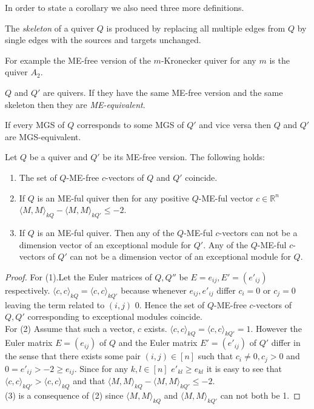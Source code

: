 \indent In order to state a corollary we also need three more definitions.
\begin{definition}
The \textit{skeleton} of a quiver $Q$ is produced by replacing all multiple edges from $Q$ by single edges with the sources and targets unchanged.\\
\end{definition}
\indent For example the ME-free version of the $m$-Kronecker quiver for any $m$ is the quiver $A_2$.
\begin{definition}
$Q$ and $Q'$ are quivers. If they have the same ME-free version and the same skeleton then they are \textit{ME-equivalent}.
\end{definition}
\begin{definition}
If every MGS of $Q$ corresponds to some MGS of $Q'$ and vice versa then $Q$ and $Q'$ are MGS-equivalent. 
\end{definition}
\begin{lemma}
\indent Let $Q$ be a quiver and $Q'$ be its ME-free version. The following holds:\label{L2}
\begin{enumerate}
\item The set of $Q$-ME-free $c$-vectors of $Q$ and $Q'$ coincide.
\item If $Q$ is an ME-ful quiver then for any positive $Q$-ME-ful vector $c\in\mathbb{R}^n$ $\langle M,M\rangle_{kQ} - \langle M,M\rangle_{kQ'} \leq -2$.
\item If $Q$ is an ME-ful quiver. Then any of the $Q$-ME-ful $c$-vectors can not be a dimension vector of an exceptional module for $Q'$. Any of the $Q$-ME-ful $c$-vectors of $Q'$ can not be a dimension vector of an exceptional module for $Q$.
\end{enumerate}
\end{lemma}
\begin{proof}
\indent For (1).Let the Euler matrices of $Q, Q''$ be $E = e_{ij}, E' = (e'_{ij})$ respectively. $\langle c,c\rangle_{kQ} = \langle c,c\rangle_{kQ'}$ because whenever $e_{ij}, e'_{ij}$ differ $c_i = 0$ or $c_j = 0$ leaving the term related to $(i,j)$ 0. Hence the set of $Q$-ME-free $c$-vectors of $Q, Q'$ corresponding to exceptional modules coincide.\\
\indent For (2) Assume that such a vector, $c$ exists. $\langle c,c\rangle_{kQ} = \langle c,c\rangle_{kQ'} = 1$. However the Euler matrix $E = (e_{ij})$ of $Q$ and the Euler matrix $E' = (e'_{ij})$ of $Q'$ differ in the sense that there exists some pair $(i,j)\in [n]$ such that $c_i\neq 0, c_j> 0$ and $0 = e'_{ij} > -2 \geq e_{ij}$. Since for any $k,l\in [n]$ $e'_{kl}\geq e_{kl}$ it is easy to see that $\langle c,c\rangle_{kQ'} > \langle c,c\rangle_{kQ}$ and that $\langle M,M\rangle_{kQ} - \langle M,M\rangle_{kQ'} \leq -2$.\\
\indent (3) is a consequence of (2) since $\langle M,M\rangle_{kQ}$ and $\langle M,M\rangle_{kQ'} $ can not both be 1.
\end{proof}
